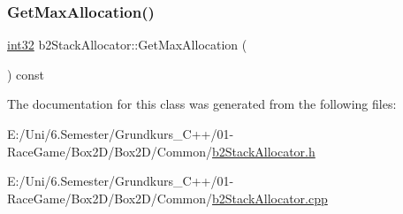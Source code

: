 \mbox{\label{classb2_stack_allocator_a9670b9ce67f939004f227d1be883404f}} 
\subsubsection{\texorpdfstring{GetMaxAllocation()}{GetMaxAllocation()}}
{\footnotesize\ttfamily \mbox{\hyperlink{b2_settings_8h_a43d43196463bde49cb067f5c20ab8481}{int32}} b2\+Stack\+Allocator\+::\+Get\+Max\+Allocation (\begin{DoxyParamCaption}{ }\end{DoxyParamCaption}) const}



The documentation for this class was generated from the following files\+:\begin{DoxyCompactItemize}
\item 
E\+:/\+Uni/6.\+Semester/\+Grundkurs\+\_\+\+C++/01-\/\+Race\+Game/\+Box2\+D/\+Box2\+D/\+Common/\mbox{\hyperlink{b2_stack_allocator_8h}{b2\+Stack\+Allocator.\+h}}\item 
E\+:/\+Uni/6.\+Semester/\+Grundkurs\+\_\+\+C++/01-\/\+Race\+Game/\+Box2\+D/\+Box2\+D/\+Common/\mbox{\hyperlink{b2_stack_allocator_8cpp}{b2\+Stack\+Allocator.\+cpp}}\end{DoxyCompactItemize}
